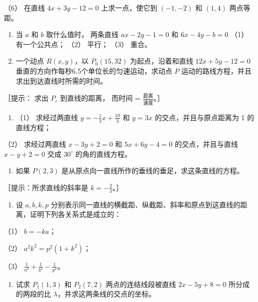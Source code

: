 （6） 在直线 \(4x + 3y - 12 = 0\) 上求一点，使它到 \((-1, -2)\) 和
\((1, 4)\) 两点等距。

\begin{enumerate}
\def\labelenumi{\arabic{enumi}.}
\setcounter{enumi}{3}
\item
  当 \(a\) 和 \(b\) 取什么值时， 两条直线 \(ax - 2y - 1 = 0\) 和
  \(6x - 4y - b = 0\) （1） 有一个公共点； （2） 平行； （3） 重合。
\item
  一个动点 \(R(x, y)\)，以 \(P_0(15, 32)\) 为起点，沿着和直线
  \(12x + 5y - 12 = 0\) 垂直的方向作每秒6.5个单位长的匀速运动，求动点
  \(P\) 运动的路线方程，并且求出到达直线时所需的时间。
\end{enumerate}

［提示： 求出 \(P_{c}\) 到直线的距离， 而时间 =
\(\frac{\text{距离}}{\text{速度}}\)。］

\begin{enumerate}
\def\labelenumi{\arabic{enumi}.}
\setcounter{enumi}{5}
\tightlist
\item
  （1） 求经过两直线 \(y = -\frac{1}{3} x + \frac{10}{3}\) 和 \(y = 3x\)
  的交点，并且与原点距离为 1 的直线方程；
\end{enumerate}

（2） 求经过两直线 \(x - 3y + 2 = 0\) 和 \(5x + 6y - 4 = 0\)
的交点，并且与直线 \(x - y + 2 = 0\) 交成 \(30^{\circ}\)
的角的直线方程。

\begin{enumerate}
\def\labelenumi{\arabic{enumi}.}
\setcounter{enumi}{6}
\tightlist
\item
  如果 \(P(2,3)\) 是从原点向一直线所作的垂线的垂足，求这条直线的方程。
\end{enumerate}

［提示：所求直线的斜率是 \(k = -\frac{2}{3}\)。］

\begin{enumerate}
\def\labelenumi{\arabic{enumi}.}
\setcounter{enumi}{7}
\tightlist
\item
  设 \(a, b, k, p\)
  分别表示同一直线的横截距、纵截距、斜率和原点到这直线的距离，证明下列各关系式是成立的：
\end{enumerate}

（1） \(b = -ka\)；

（2） \(a^2 k^2 = p^2 (1 + k^2)\)；

（3） \(\frac{1}{a^2} + \frac{1}{b^2} - \frac{1}{p^2}\)。

\begin{enumerate}
\def\labelenumi{\arabic{enumi}.}
\setcounter{enumi}{8}
\tightlist
\item
  试求 \(P_{1}(1,3)\) 和 \(P_{2}(7,2)\) 两点的连结线段被直线
  \(2x - 5y + 8 = 0\) 所分成的两段的比
  \(\lambda\)，并求这两条线的交点的坐标。
\end{enumerate}

